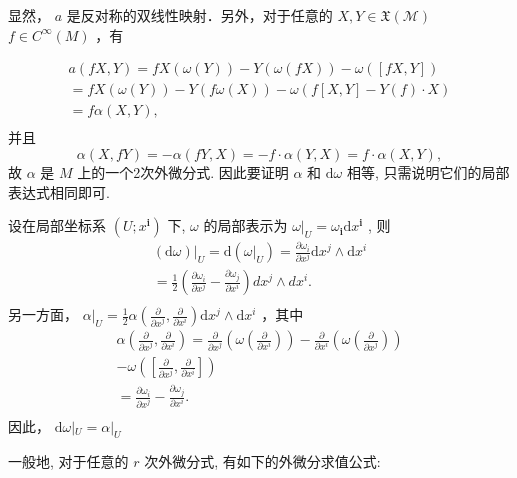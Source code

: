 显然，  $a$  是反对称的双线性映射．另外，对于任意的  $X,Y\in \mathfrak{X}(\mathcal{M})$ $f\in C^{\infty}(M)$  ，有

$$
\begin{array}{l} a (f X, Y) = f X (\omega (Y)) - Y (\omega (f X)) - \omega ([ f X, Y ]) \\ = f X (\omega (Y)) - Y (f \omega (X)) - \omega (f [ X, Y ] - Y (f) \cdot X) \\ = f \alpha (X, Y), \\ \end{array}
$$
并且
$$
\alpha (X, f Y) = - \alpha (f Y, X) = - f \cdot \alpha (Y, X) = f \cdot \alpha (X, Y),
$$
故  $\alpha$  是  $M$  上的一个2次外微分式. 因此要证明  $\alpha$  和  $\mathrm{d}\omega$  相等, 只需说明它们的局部表达式相同即可.

设在局部坐标系  $(U; x^{\mathbf{i}})$  下,  $\omega$  的局部表示为  $\omega|_{U} = \omega_{\mathbf{i}} \mathrm{d}x^{\mathbf{i}}$ , 则
$$
\begin{array}{l} \left. (\mathrm {d} \omega) \right| _ {U} = \mathrm {d} (\omega | _ {U}) = \frac {\partial \omega_ {i}}{\partial x ^ {j}} \mathrm {d} x ^ {j} \wedge \mathrm {d} x ^ {i} \\ = \frac {1}{2} \left(\frac {\partial \omega_ {i}}{\partial x ^ {j}} - \frac {\partial \omega_ {j}}{\partial x ^ {i}}\right) d x ^ {j} \wedge d x ^ {i}. \\ \end{array}
$$
另一方面，  $\alpha |_{U} = \frac{1}{2}\alpha \left(\frac{\partial}{\partial x^{j}},\frac{\partial}{\partial x^{i}}\right)\mathrm{d}x^{j}\wedge \mathrm{d}x^{i}$  ，其中
$$
\begin{array}{l} \alpha \left(\frac {\partial}{\partial x ^ {j}}, \frac {\partial}{\partial x ^ {i}}\right) = \frac {\partial}{\partial x ^ {j}} \left(\omega \left(\frac {\partial}{\partial x ^ {i}}\right)\right) - \frac {\partial}{\partial x ^ {i}} \left(\omega \left(\frac {\partial}{\partial x ^ {j}}\right)\right) \\ - \omega \left(\left[ \frac {\partial}{\partial x ^ {j}}, \frac {\partial}{\partial x ^ {i}} \right]\right) \\ = \frac {\partial \omega_ {i}}{\partial x ^ {j}} - \frac {\partial \omega_ {j}}{\partial x ^ {i}}. \\ \end{array}
$$
因此，  $\mathrm{d}\omega |_{U} = \alpha |_{U}$

一般地, 对于任意的  $r$  次外微分式, 有如下的外微分求值公式:

